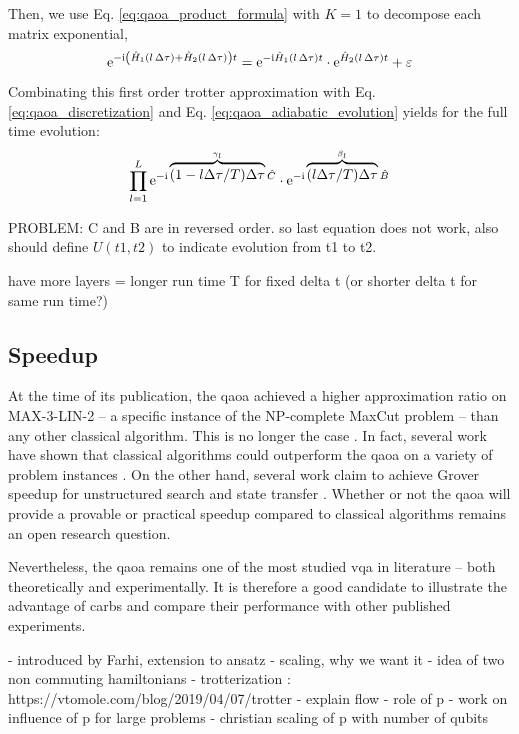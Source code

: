 Then, we use Eq. \eqref{eq:qaoa_product_formula} with $K = 1$ to decompose each matrix exponential,
\begin{equation}
    \mathrm e^{-\mathrm i\left(\hat H_{1}(l\,\Delta \tau) + \hat H_{2}(l\,\Delta \tau)\right) t} = \mathrm e^{-\mathrm i\hat H_{1}(l\,\Delta \tau)t}\cdot \mathrm e^{\hat H_{2}(l\,\Delta \tau) t} + \varepsilon 
\end{equation}
Combinating this first order trotter approximation with  Eq. \eqref{eq:qaoa_discretization} and Eq. \eqref{eq:qaoa_adiabatic_evolution} yields for the full time evolution:
\begin{equation}
    \prod_{l=1}^L\mathrm e^{-\mathrm i\overbrace{(1-l\Delta\tau/T)\Delta\tau}^{\gamma_l}\hat C} \cdot \mathrm e^{-\mathrm i\overbrace{(l\Delta\tau/T)\Delta\tau}^{\beta_l}\hat B} 
\end{equation}

PROBLEM: C and B are in reversed order. so last equation does not work, also should define $U(t1, t2) $ to indicate evolution from t1 to t2. 

have more layers = longer run time T for fixed delta t (or shorter delta t for same run time?)


\subsection{Speedup}
At the time of its publication, the \gls{qaoa} achieved a higher approximation ratio on MAX-3-LIN-2 -- a specific instance of the NP-complete MaxCut problem \cite{GareyM1990} -- than any other classical algorithm. This is no longer the case \cite{Barak2015BeatingDegree, Hastings2019CLASSICALALGORITHMS}. In fact, several work have shown that classical algorithms could outperform the \gls{qaoa} on a variety of problem instances \cite{Barak2015BeatingDegree, Hastings2019CLASSICALALGORITHMS, Bravyi2019ObstaclesProtection}. On the other hand, several work claim to achieve Grover speedup for unstructured search \cite{Jiang2017Near-optimalField} and state transfer \cite{Niu2019OptimizingDepth}. Whether or not the \gls{qaoa} will provide a provable or practical speedup compared to classical algorithms remains an open research question.

Nevertheless, the \gls{qaoa} remains one of the most studied \gls{vqa} in literature -- both theoretically and experimentally. It is therefore a good candidate to illustrate the advantage of \glspl{carb} and compare their performance with other published experiments. 


- introduced by Farhi, extension to ansatz
- scaling, why we want it
- idea of two non commuting hamiltonians
- trotterization : https://vtomole.com/blog/2019/04/07/trotter 
- explain flow
- role of p
- work on influence of p for large problems
- christian scaling of p with number of qubits
